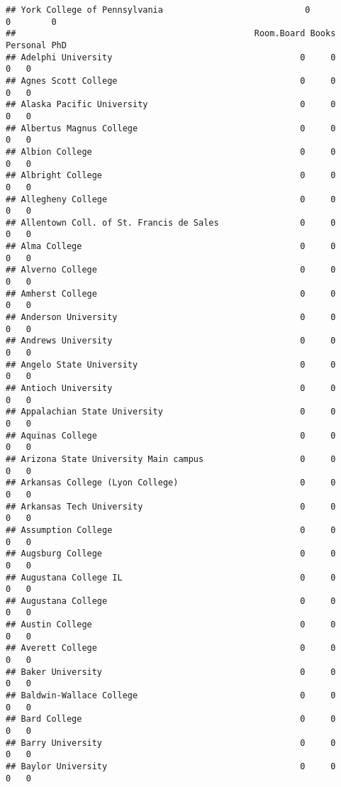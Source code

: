 \documentclass[
]{article}
\begin{document}
\begin{verbatim}
## York College of Pennsylvania                            0           0        0
##                                               Room.Board Books Personal PhD
## Adelphi University                                     0     0        0   0
## Agnes Scott College                                    0     0        0   0
## Alaska Pacific University                              0     0        0   0
## Albertus Magnus College                                0     0        0   0
## Albion College                                         0     0        0   0
## Albright College                                       0     0        0   0
## Allegheny College                                      0     0        0   0
## Allentown Coll. of St. Francis de Sales                0     0        0   0
## Alma College                                           0     0        0   0
## Alverno College                                        0     0        0   0
## Amherst College                                        0     0        0   0
## Anderson University                                    0     0        0   0
## Andrews University                                     0     0        0   0
## Angelo State University                                0     0        0   0
## Antioch University                                     0     0        0   0
## Appalachian State University                           0     0        0   0
## Aquinas College                                        0     0        0   0
## Arizona State University Main campus                   0     0        0   0
## Arkansas College (Lyon College)                        0     0        0   0
## Arkansas Tech University                               0     0        0   0
## Assumption College                                     0     0        0   0
## Augsburg College                                       0     0        0   0
## Augustana College IL                                   0     0        0   0
## Augustana College                                      0     0        0   0
## Austin College                                         0     0        0   0
## Averett College                                        0     0        0   0
## Baker University                                       0     0        0   0
## Baldwin-Wallace College                                0     0        0   0
## Bard College                                           0     0        0   0
## Barry University                                       0     0        0   0
## Baylor University                                      0     0        0   0

\end{verbatim}
\end{document}
